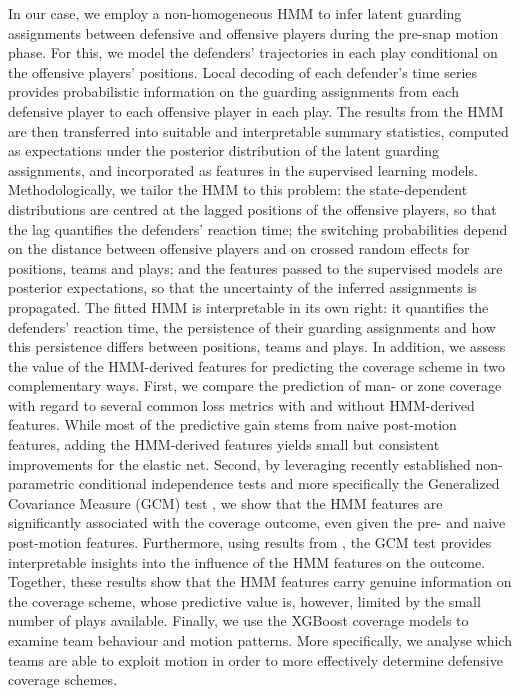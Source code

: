 \documentclass[namedate,webpdf,modern,medium]{oup-authoring-template}
\begin{document}
In our case, we employ a non-homogeneous HMM to infer latent guarding assignments between defensive and offensive players during the pre-snap motion phase. For this, we model the defenders’ trajectories in each play conditional on the offensive players' positions. Local decoding of each defender’s time series provides probabilistic information on the guarding assignments from each defensive player to each offensive player in each play. 
The results from the HMM are then transferred into suitable and interpretable summary statistics, computed as expectations under the posterior distribution of the latent guarding assignments, and incorporated as features in the supervised learning models.
Methodologically, we tailor the HMM to this problem: the state-dependent distributions are centred at the lagged positions of the offensive players, so that the lag quantifies the defenders' reaction time; the switching probabilities depend on the distance between offensive players and on crossed random effects for positions, teams and plays; and the features passed to the supervised models are posterior expectations, so that the uncertainty of the inferred assignments is propagated. The fitted HMM is interpretable in its own right: it quantifies the defenders' reaction time, the persistence of their guarding assignments and how this persistence differs between positions, teams and plays. In addition, we assess the value of the HMM-derived features for predicting the coverage scheme in two complementary ways. First, we compare the prediction of man- or zone coverage with regard to several common loss metrics with and without HMM-derived features. While most of the predictive gain stems from naive post-motion features, adding the HMM-derived features yields small but consistent improvements for the elastic net. %
Second, by leveraging recently established non-parametric conditional independence tests and more specifically the Generalized Covariance Measure (GCM) test \citep{Shah20gcm}, we show that the HMM features are significantly associated with the coverage outcome, even given the pre- and naive post-motion features. Furthermore, using results from \citet{bajons2025rGAX}, the GCM test provides interpretable insights into the influence of the HMM features on the outcome. Together, these results show that the HMM features carry genuine information on the coverage scheme, whose predictive value is, however, limited by the small number of plays available. Finally, we use the XGBoost coverage models to examine team behaviour and motion patterns. More specifically, we analyse which teams are able to exploit motion in order to more effectively determine defensive coverage schemes. 
\end{document}
